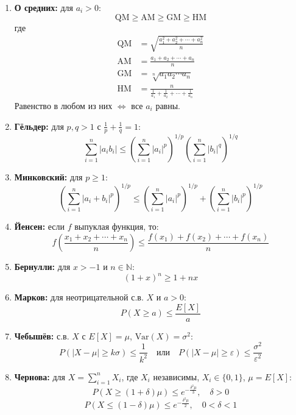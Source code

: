 \begin{enumerate}
\begin{enumerate}
        \item \textbf{О средних:} для $a_i > 0$:
        \[
            \text{QM} \geq \text{AM} \geq \text{GM} \geq \text{HM}
        \]
        где
        \begin{align*}
            \text{QM} &= \sqrt{\frac{a_1^2 + a_2^2 + \cdots + a_n^2}{n}} \\
            \text{AM} &= \frac{a_1 + a_2 + \cdots + a_n}{n} \\
            \text{GM} &= \sqrt[n]{a_1 a_2 \cdots a_n} \\
            \text{HM} &= \frac{n}{\frac{1}{a_1} + \frac{1}{a_2} + \cdots + \frac{1}{a_n}}
        \end{align*}
        Равенство в любом из них $\Leftrightarrow$ все $a_i$ равны.
        
        \item \textbf{Гёльдер:} для $p, q > 1$ с $\frac{1}{p} + \frac{1}{q} = 1$:
        \[
            \sum_{i=1}^{n} |a_i b_i| \leq \left(\sum_{i=1}^{n} |a_i|^p\right)^{1/p} \left(\sum_{i=1}^{n} |b_i|^q\right)^{1/q}
        \]
        
        \item \textbf{Минковский:} для $p \geq 1$:
        \[
            \left(\sum_{i=1}^{n} |a_i + b_i|^p\right)^{1/p} \leq \left(\sum_{i=1}^{n} |a_i|^p\right)^{1/p} + \left(\sum_{i=1}^{n} |b_i|^p\right)^{1/p}
        \]
        
        \item \textbf{Йенсен:} если $f$ выпуклая функция, то:
        \[
            f\left(\frac{x_1 + x_2 + \cdots + x_n}{n}\right) \leq \frac{f(x_1) + f(x_2) + \cdots + f(x_n)}{n}
        \]
        
        
        \item \textbf{Бернулли:} для $x > -1$ и $n \in \mathbb{N}$:
        \[
            (1 + x)^n \geq 1 + nx
        \]
        
        \item \textbf{Марков:} для неотрицательной с.в. $X$ и $a > 0$:
        \[
            P(X \geq a) \leq \frac{E[X]}{a}
        \]
        
        \item \textbf{Чебышёв:} с.в. $X$ с $E[X] = \mu$, $\text{Var}(X) = \sigma^2$:
        \[
            P(|X - \mu| \geq k\sigma) \leq \frac{1}{k^2} \quad \text{или} \quad P(|X - \mu| \geq \varepsilon) \leq \frac{\sigma^2}{\varepsilon^2}
        \]
        
        \item \textbf{Чернова:} для $X = \sum_{i=1}^n X_i$, где $X_i$ независимы, $X_i \in \{0,1\}$, $\mu = E[X]$:
        \[
            P(X \geq (1+\delta)\mu) \leq e^{-\frac{\delta^2 \mu}{3}}, \quad \delta > 0
        \]
        \[
            P(X \leq (1-\delta)\mu) \leq e^{-\frac{\delta^2 \mu}{2}}, \quad 0 < \delta < 1
        \]
        

\end{enumerate}
\end{enumerate}
